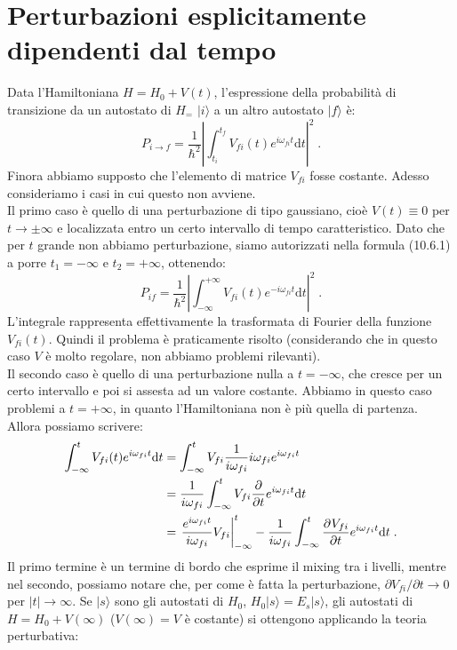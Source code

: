 \documentclass[10pt,a4paper]{report}
\theoremstyle{definition}
\newcommand{\pdev}[3][]{\frac{\partial^{#1} #2}{\partial #3^{#1}}}
\numberwithin{equation}{section}
\newcommand{\diff}[1][]{\mathrm{d}#1}
\newcommand{\ket}{\rangle}
\begin{document}
\section{Perturbazioni esplicitamente dipendenti dal tempo}
Data l'Hamiltoniana $H=H_0+V(t)$, l'espressione della probabilità di transizione da un autostato di $H_=$ $|i\ket$ a un altro autostato $|f\ket$ è:
\begin{equation}
P_{i\to f}=\frac{1}{\hbar^2}\left|\int_{t_i}^{t_f} V_{fi}(t)e^{i\omega_{fi}t}\diff{t}\right|^2\;.
\end{equation}
Finora abbiamo supposto che l'elemento di matrice $V_{fi}$ fosse costante. Adesso consideriamo i casi in cui questo non avviene. \\
Il primo caso è quello di una perturbazione di tipo gaussiano, cioè $V(t)\equiv 0$ per $t\to\pm\infty$ e localizzata entro un certo intervallo di tempo caratteristico. Dato che per $t$ grande non abbiamo perturbazione, siamo autorizzati nella formula (10.6.1) a porre $t_1=-\infty$ e $t_2=+\infty$, ottenendo:
\begin{equation}
P_{if}=\frac{1}{\hbar^2}\left|\int_{-\infty}^{+\infty} V_{fi}(t)e^{-i\omega_{fi}t}\diff{t}\right|^2\;.
\end{equation}
L'integrale rappresenta effettivamente la trasformata di Fourier della funzione $V_{fi}(t)$. Quindi il problema è praticamente risolto (considerando che in questo caso $V$ è molto regolare, non abbiamo problemi rilevanti).\\
Il secondo caso è quello di una perturbazione nulla a $t=-\infty$, che cresce per un certo intervallo e poi si assesta ad un valore costante. Abbiamo in questo caso problemi a $t=+\infty$, in quanto l'Hamiltoniana non è più quella di partenza. Allora possiamo scrivere:
\begin{align}
\int_{-\infty}^t V_{fi}(t)e^{i\omega_{fi}t}\diff{t}&= \int_{-\infty}^t V_{fi}\frac{1}{i\omega_{fi}}i\omega_{fi}e^{i\omega_{fi}t} \notag \\
&= \frac{1}{i\omega_{fi}}\int_{-\infty}^t V_{fi}\frac{\partial}{\partial t}e^{i\omega_{fi}t}\diff{t} \notag \\
&= \left.\frac{e^{i\omega_{fi}t}}{i\omega_{fi}}V_{fi}\right|^t_{-\infty}-\frac{1}{i\omega_{fi}}\int_{-\infty}^t\pdev{V_{fi}}{t}e^{i\omega_{fi}t}\diff{t}\;.
\end{align}
Il primo termine è un termine di bordo che esprime il mixing tra i livelli, mentre nel secondo, possiamo notare che, per come è fatta la perturbazione, $\partial V_{fi}/\partial t\to 0$ per $|t|\to\infty$. Se $|s\ket$ sono gli autostati di $H_0$, $H_0|s\ket=E_s|s\ket$, gli autostati di $H=H_0+V(\infty)$ ($V(\infty)=V$ è costante) si ottengono applicando la teoria perturbativa:
\end{document}
